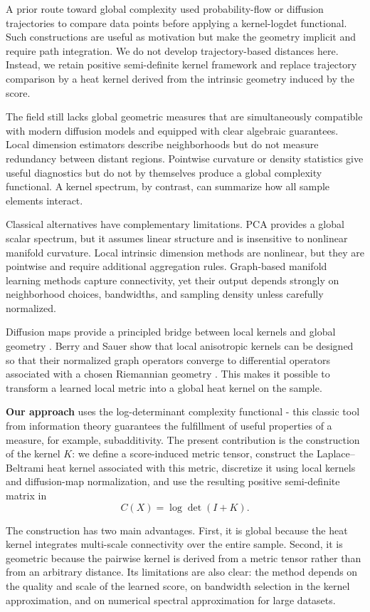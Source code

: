\documentclass{article}
\begin{document}
A prior route toward global complexity used probability-flow or diffusion trajectories to compare data points before applying a kernel-logdet functional. Such constructions are useful as motivation but make the geometry implicit and require path integration. We do not develop trajectory-based distances here. Instead, we retain positive semi-definite kernel framework and replace trajectory comparison by a heat kernel derived from the intrinsic geometry induced by the score.

The field still lacks global geometric measures that are simultaneously compatible with modern diffusion models and equipped with clear algebraic guarantees. Local dimension estimators describe neighborhoods but do not measure redundancy between distant regions. Pointwise curvature or density statistics give useful diagnostics but do not by themselves produce a global complexity functional. A kernel spectrum, by contrast, can summarize how all sample elements interact.

Classical alternatives have complementary limitations. PCA provides a global scalar spectrum, but it assumes linear structure and is insensitive to nonlinear manifold curvature. Local intrinsic dimension methods are nonlinear, but they are pointwise and require additional aggregation rules. Graph-based manifold learning methods capture connectivity, yet their output depends strongly on neighborhood choices, bandwidths, and sampling density unless carefully normalized.

Diffusion maps provide a principled bridge between local kernels and global geometry \citep{coifman2006diffusion}. Berry and Sauer show that local anisotropic kernels can be designed so that their normalized graph operators converge to differential operators associated with a chosen Riemannian geometry \citep{berry2016local}. This makes it possible to transform a learned local metric into a global heat kernel on the sample.

\textbf{Our approach} uses the log-determinant complexity functional - this classic tool from information theory guarantees the fulfillment of useful properties of a measure, for example, subadditivity. The present contribution is the construction of the kernel \(K\): we define a score-induced metric tensor, construct the Laplace--Beltrami heat kernel associated with this metric, discretize it using local kernels and diffusion-map normalization, and use the resulting positive semi-definite matrix in 
\[
C(X)=\log\det(I+K).
\]

The construction has two main advantages. First, it is global because the heat kernel integrates multi-scale connectivity over the entire sample. Second, it is geometric because the pairwise kernel is derived from a metric tensor rather than from an arbitrary distance. Its limitations are also clear: the method depends on the quality and scale of the learned score, on bandwidth selection in the kernel approximation, and on numerical spectral approximation for large datasets.
\end{document}
